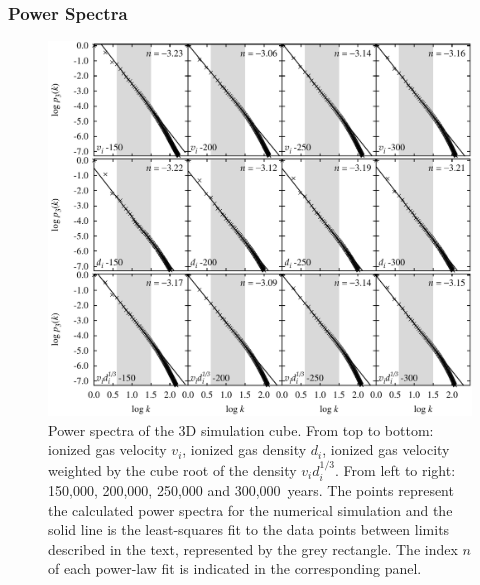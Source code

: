 \documentclass[useAMS,usenatbib]{mn2e}
\begin{document}
\subsubsection{Power Spectra}
\label{sssec:pspec}
\begin{figure}
\centering
\includegraphics[width=\textwidth]{ps-all-3k-ref}
\caption{Power spectra of the 3D simulation cube. From top to bottom: ionized gas velocity
  $v_i$, ionized gas density $d_i$, ionized gas velocity weighted by the cube root
  of the density $v_i d_i^{1/3}$.  From left to right: 150,000, 200,000, 250,000 and
  300,000~years. The points represent the calculated power spectra for
  the numerical simulation  and the solid line is the least-squares fit to
the data points between limits described in the
text, represented by the grey rectangle. The index $n$ of each
power-law fit is indicated in the corresponding panel.}
\label{fig:ps}
\end{figure}
\end{document}
